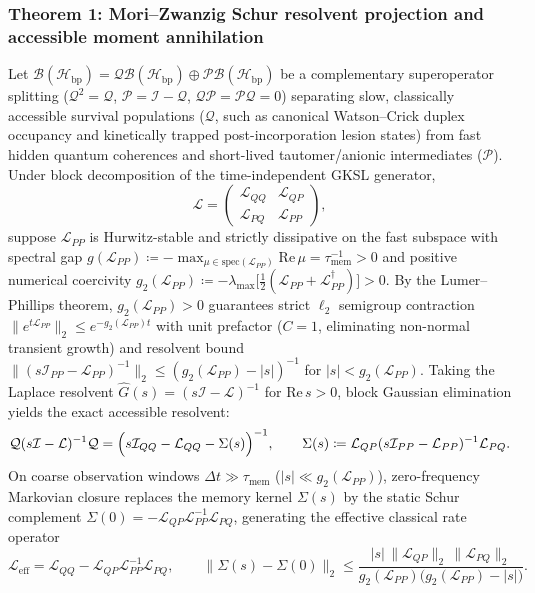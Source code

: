 \documentclass[10pt,letterpaper]{article}
\theoremstyle{plain}
\theoremstyle{definition}
\newcommand{\Lcal}{\mathcal{L}}
\newcommand{\Qcal}{\mathcal{Q}}
\newcommand{\Pcal}{\mathcal{P}}
\newcommand{\Hcal}{\mathcal{H}}
\newcommand{\Bcal}{\mathcal{B}}
\begin{document}
\subsubsection*{Theorem 1: Mori--Zwanzig Schur resolvent projection and accessible moment annihilation}

Let $\Bcal(\Hcal_{\mathrm{bp}}) = \Qcal \Bcal(\Hcal_{\mathrm{bp}}) \oplus \Pcal \Bcal(\Hcal_{\mathrm{bp}})$ be a complementary superoperator splitting ($\Qcal^2 = \Qcal$, $\Pcal = \mathcal{I} - \Qcal$, $\Qcal\Pcal = \Pcal\Qcal = 0$) separating slow, classically accessible survival populations ($\Qcal$, such as canonical Watson--Crick duplex occupancy and kinetically trapped post-incorporation lesion states) from fast hidden quantum coherences and short-lived tautomer/anionic intermediates ($\Pcal$). Under block decomposition of the time-independent GKSL generator,
\begin{equation}
    \Lcal = \begin{pmatrix} \Lcal_{QQ} & \Lcal_{QP} \\ \Lcal_{PQ} & \Lcal_{PP} \end{pmatrix},
\end{equation}
suppose $\Lcal_{PP}$ is Hurwitz-stable and strictly dissipative on the fast subspace with spectral gap $g(\Lcal_{PP}) \coloneqq -\max_{\mu \in \mathrm{spec}(\Lcal_{PP})} \mathrm{Re}\,\mu = \tau_{\mathrm{mem}}^{-1} > 0$ and positive numerical coercivity $g_2(\Lcal_{PP}) \coloneqq -\lambda_{\max}\!\bigl[\frac{1}{2}(\Lcal_{PP} + \Lcal_{PP}^\dagger)\bigr] > 0$. By the Lumer--Phillips theorem, $g_2(\Lcal_{PP}) > 0$ guarantees strict $\ell_2$ semigroup contraction $\|e^{t\Lcal_{PP}}\|_2 \le e^{-g_2(\Lcal_{PP})t}$ with unit prefactor ($C = 1$, eliminating non-normal transient growth) and resolvent bound $\|(s\mathcal{I}_{PP} - \Lcal_{PP})^{-1}\|_2 \le (g_2(\Lcal_{PP}) - |s|)^{-1}$ for $|s| < g_2(\Lcal_{PP})$. Taking the Laplace resolvent $\widehat{G}(s) = (s\mathcal{I} - \Lcal)^{-1}$ for $\mathrm{Re}\,s > 0$, block Gaussian elimination yields the exact accessible resolvent:
\begin{equation}
    \Qcal (s\mathcal{I} - \Lcal)^{-1} \Qcal = \Bigl(s\mathcal{I}_{QQ} - \Lcal_{QQ} - \Sigma(s)\Bigr)^{-1}, \qquad
    \Sigma(s) \coloneqq \Lcal_{QP}(s\mathcal{I}_{PP} - \Lcal_{PP})^{-1}\Lcal_{PQ}.
    \label{eq:schur}
\end{equation}
On coarse observation windows $\Delta t \gg \tau_{\mathrm{mem}}$ ($|s| \ll g_2(\Lcal_{PP})$), zero-frequency Markovian closure replaces the memory kernel $\Sigma(s)$ by the static Schur complement $\Sigma(0) = -\Lcal_{QP}\Lcal_{PP}^{-1}\Lcal_{PQ}$, generating the effective classical rate operator
\begin{equation}
    \Lcal_{\mathrm{eff}} = \Lcal_{QQ} - \Lcal_{QP}\Lcal_{PP}^{-1}\Lcal_{PQ}, \qquad
    \bigl\|\Sigma(s) - \Sigma(0)\bigr\|_2 \le \frac{|s|\,\|\Lcal_{QP}\|_2\,\|\Lcal_{PQ}\|_2}{g_2(\Lcal_{PP})\bigl(g_2(\Lcal_{PP}) - |s|\bigr)}.
    \label{eq:leff}
\end{equation}
\end{document}
